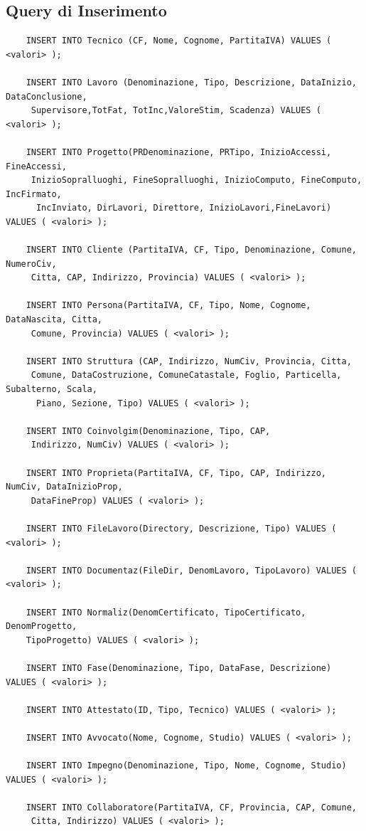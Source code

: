 \documentclass{elegantbook}
\begin{document}
\subsection{Query di Inserimento}
\begin{verbatim}
	INSERT INTO Tecnico (CF, Nome, Cognome, PartitaIVA) VALUES ( <valori> );
	
	INSERT INTO Lavoro (Denominazione, Tipo, Descrizione, DataInizio, DataConclusione,
	 Supervisore,TotFat, TotInc,ValoreStim, Scadenza) VALUES ( <valori> );
	 
	INSERT INTO Progetto(PRDenominazione, PRTipo, InizioAccessi, FineAccessi,
	 InizioSopralluoghi, FineSopralluoghi, InizioComputo, FineComputo, IncFirmato,
	  IncInviato, DirLavori, Direttore, InizioLavori,FineLavori) VALUES ( <valori> );
	 
	INSERT INTO Cliente (PartitaIVA, CF, Tipo, Denominazione, Comune, NumeroCiv,
	 Citta, CAP, Indirizzo, Provincia) VALUES ( <valori> );
	 
	INSERT INTO Persona(PartitaIVA, CF, Tipo, Nome, Cognome, DataNascita, Citta,
	 Comune, Provincia) VALUES ( <valori> );
	 
	INSERT INTO Struttura (CAP, Indirizzo, NumCiv, Provincia, Citta,
	 Comune, DataCostruzione, ComuneCatastale, Foglio, Particella, Subalterno, Scala,
	  Piano, Sezione, Tipo) VALUES ( <valori> );
	 
	INSERT INTO Coinvolgim(Denominazione, Tipo, CAP,
	 Indirizzo, NumCiv) VALUES ( <valori> );
	 
	INSERT INTO Proprieta(PartitaIVA, CF, Tipo, CAP, Indirizzo, NumCiv, DataInizioProp,
	 DataFineProp) VALUES ( <valori> );
	 
	INSERT INTO FileLavoro(Directory, Descrizione, Tipo) VALUES ( <valori> );
	
	INSERT INTO Documentaz(FileDir, DenomLavoro, TipoLavoro) VALUES ( <valori> );
	
	INSERT INTO Normaliz(DenomCertificato, TipoCertificato, DenomProgetto, 
	TipoProgetto) VALUES ( <valori> );
	
	INSERT INTO Fase(Denominazione, Tipo, DataFase, Descrizione) VALUES ( <valori> );
	
	INSERT INTO Attestato(ID, Tipo, Tecnico) VALUES ( <valori> );
	
	INSERT INTO Avvocato(Nome, Cognome, Studio) VALUES ( <valori> );
	
	INSERT INTO Impegno(Denominazione, Tipo, Nome, Cognome, Studio) VALUES ( <valori> );
	
	INSERT INTO Collaboratore(PartitaIVA, CF, Provincia, CAP, Comune,
	 Citta, Indirizzo) VALUES ( <valori> );
	 

\end{verbatim}
\end{document}
